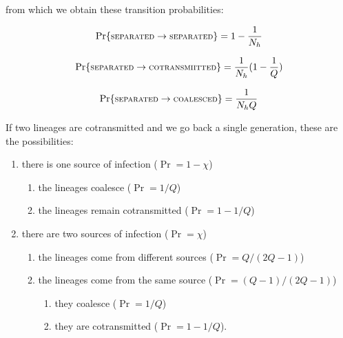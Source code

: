 \documentclass[_main.tex]{subfiles}
\begin{document}
from which we obtain these transition probabilities:

\begin{equation*} \label{eq:supp_coal1}
\Pr \{ \textsc{\small{separated}} \rightarrow \textsc{\small{separated}} \} 
= 1 - \frac{1}{N_h}
\end{equation*}

\begin{equation*} \label{eq:supp_coal2}
\Pr \{ \textsc{\small{separated}} \rightarrow \textsc{\small{cotransmiitted}} \} 
= \frac{1}{N_h} (1 - \frac{1}{Q})
\end{equation*}

\begin{equation*} \label{eq:supp_coal3}
\Pr \{ \textsc{\small{separated}} \rightarrow \textsc{\small{coalesced}} \} 
= \frac{1}{N_hQ}
\end{equation*}

\noindent If two lineages are cotransmitted and we go back a single generation, these are the possibilities:

\begin{enumerate}

\item there is one source of infection ($\Pr = 1 -\chi$)

\begin{enumerate}

\item the lineages coalesce ($\Pr = 1/Q$)

\item the lineages remain cotransmitted ($\Pr = 1 - 1/Q$)

\end{enumerate}  

\item there are two sources of infection ($\Pr = \chi$)

\begin{enumerate}

\item the lineages come from different sources ($\Pr = Q/(2Q-1)$)

\item the lineages come from the same source  ($\Pr = (Q-1)/(2Q-1)$)

\begin{enumerate}

\item they coalesce ($\Pr = 1/Q$) 

\item they are cotransmitted ($\Pr = 1 -1/Q$). 

\end{enumerate} 

\end{enumerate}

\end{enumerate} 
\end{document}
